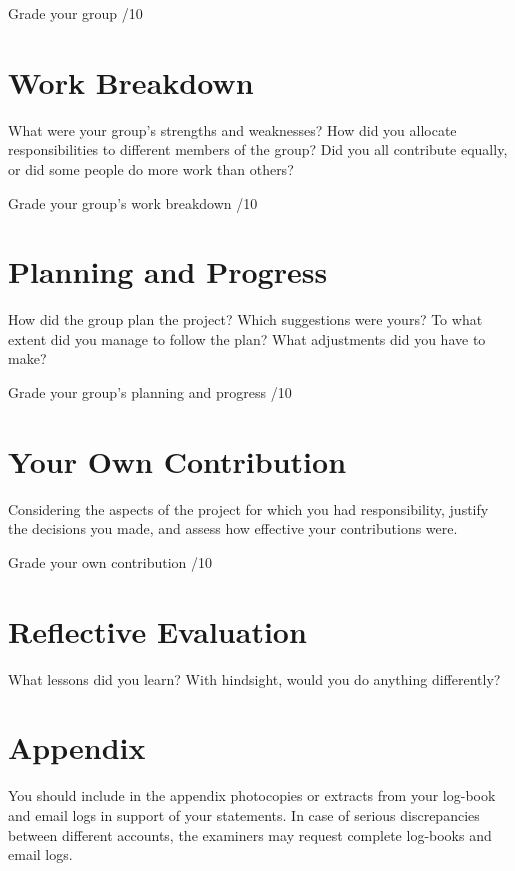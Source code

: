 \documentclass[a4paper,12pt]{article}
\begin{document}
Grade your group /10

\section{Work Breakdown}

What were your group’s strengths and weaknesses?  How did you allocate responsibilities to different members of the group?  Did you all contribute equally, or did some people do more work than others?

Grade your group’s work breakdown /10

\section{Planning and Progress}

How did the group plan the project?  Which suggestions were yours?  To what extent did you manage to follow the plan?  What adjustments did you have to make?

Grade your group’s planning and progress /10

\section{Your Own Contribution}

Considering the aspects of the project for which you had responsibility, justify the decisions you made, and assess how effective your contributions were.

Grade your own contribution /10

\section{Reflective Evaluation}

What lessons did you learn?  With hindsight, would you do anything differently?

\appendix
\section{Appendix}

You should include in the appendix photocopies or extracts from your log-book and email logs in support of your statements.  In case of serious discrepancies between different accounts, the examiners may request complete log-books and email logs.
\end{document}
